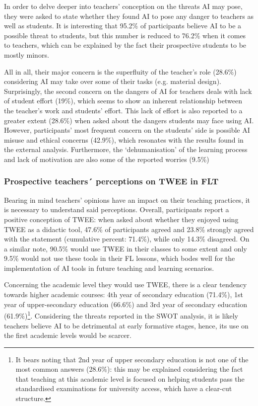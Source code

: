 In order to delve deeper into teachers' conception on the threats AI may
pose, they were asked to state whether they found AI to pose any danger
to teachers as well as students. It is interesting that 95.2\% of
participants believe AI to be a possible threat to students, but this
number is reduced to 76.2\% when it comes to teachers, which can be
explained by the fact their prospective students to be mostly minors.

All in all, their major concern is the superfluity of the teacher's role
(28.6\%) considering AI may take over some of their tasks (e.g. material
design). Surprisingly, the second concern on the dangers of AI for
teachers deals with lack of student effort (19\%), which seems to show
an inherent relationship between the teacher's work and students'
effort. This lack of effort is also reported to a greater extent
(28.6\%) when asked about the dangers students may face using AI.
However, participants' most frequent concern on the students' side is
possible AI misuse and ethical concerns (42.9\%), which resonates with
the results found in the external analysis. Furthermore, the
`dehumanisation' of the learning process and lack of motivation are also
some of the reported worries (9.5\%)

\subsubsection{Prospective teachers´ perceptions on TWEE in FLT}\label{sub-sub-sec-prospectiveteachers}

Bearing in mind teachers' opinions have an impact on their teaching
practices, it is necessary to understand said perceptions. Overall,
participants report a positive conception of TWEE: when asked about
whether they enjoyed using TWEE as a didactic tool, 47.6\% of
participants agreed and 23.8\% strongly agreed with the statement
(cumulative percent: 71.4\%), while only 14.3\% disagreed. On a similar
note, 90.5\% would use TWEE in their classes to some extent and only
9.5\% would not use these tools in their FL lessons, which bodes well
for the implementation of AI tools in future teaching and learning
scenarios.

Concerning the academic level they would use TWEE, there is a clear
tendency towards higher academic courses: 4th year of secondary
education (71.4\%), 1st year of upper-secondary education (66.6\%) and
3rd year of secondary education (61.9\%)\footnote{It bears noting that
  2nd year of upper secondary education is not one of the most common
  answers (28.6\%): this may be explained considering the fact that
  teaching at this academic level is focused on helping students pass
  the standardised examinations for university access, which have a
  clear-cut structure.}. Considering the threats reported in the SWOT
analysis, it is likely teachers believe AI to be detrimental at early
formative stages, hence, its use on the first academic levels would be
scarcer.

